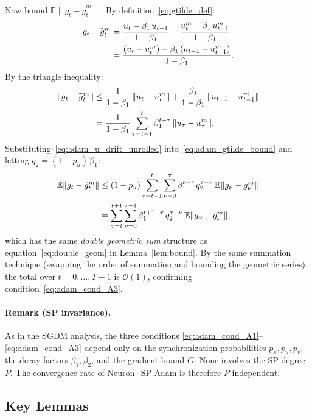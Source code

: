 \documentclass{article}
\begin{document}
Now bound $\mathbb{E}\|g_t - \widetilde{g}_t^m\|$.
By definition~\eqref{eq:gtilde_def}:
\begin{align}
g_t - \widetilde{g}_t^m
&= \frac{u_t - \beta_1\,u_{t-1}}{1-\beta_1}
   - \frac{u_t^m - \beta_1\,u_{t-1}^m}{1-\beta_1} \notag \\
&= \frac{(u_t - u_t^m) - \beta_1\,(u_{t-1} - u_{t-1}^m)}{1-\beta_1}.
\label{eq:adam_gtilde_diff}
\end{align}
By the triangle inequality:
\begin{align}
\|g_t - \widetilde{g}_t^m\|
&\leq \frac{1}{1-\beta_1}\,\|u_t - u_t^m\|
  + \frac{\beta_1}{1-\beta_1}\,\|u_{t-1} - u_{t-1}^m\| \notag \\
&= \frac{1}{1-\beta_1}\sum_{\tau=t-1}^{t}
\beta_1^{t-\tau}\,\|u_\tau - u_\tau^m\|.
\label{eq:adam_gtilde_bound}
\end{align}
Substituting~\eqref{eq:adam_u_drift_unrolled}
into~\eqref{eq:adam_gtilde_bound} and letting
$q_2 = (1-p_u)\,\beta_1$:
\begin{align}
\mathbb{E}\|g_t - \widetilde{g}_t^m\|
&\leq (1-p_u)\sum_{\tau=t-1}^{t}\sum_{\nu=0}^{\tau}
\beta_1^{t-\tau}\,q_2^{\tau-\nu}\,\mathbb{E}\|g_\nu - g_\nu^m\|
\notag \\
&= \sum_{\tau=t}^{t+1}\sum_{\nu=0}^{\tau-1}
\beta_1^{t+1-\tau}\,q_2^{\tau-\nu}\,\mathbb{E}\|g_\nu - g_\nu^m\|,
\label{eq:adam_gtilde_double_geom}
\end{align}
which has the same \emph{double geometric sum} structure as
equation~\eqref{eq:double_geom} in Lemma~\ref{lem:bound}. By the same
summation technique (swapping the order of summation and bounding the
geometric series), the total over $t = 0, \ldots, T-1$ is $\mathcal{O}(1)$,
confirming condition~\eqref{eq:adam_cond_A3}.

\paragraph{Remark (SP invariance).}
As in the SGDM analysis, the three conditions
\eqref{eq:adam_cond_A1}--\eqref{eq:adam_cond_A3} depend only on the
synchronization probabilities $p_x, p_u, p_v$, the decay factors
$\beta_1, \beta_2$, and the gradient bound $G$. None involves the SP
degree $P$. The convergence rate of Neuron\_SP-Adam is therefore
$P$-independent.

\subsection{Key Lemmas}
\label{sec:key_lemmas}
\end{document}

